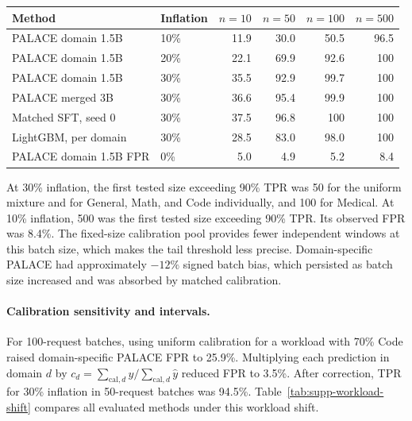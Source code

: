 \documentclass[11pt]{article}
\begin{document}
\begin{center}
\begin{minipage}{\linewidth}
\centering
{}\label{tab:supp-batch-detection}
\small
\begin{tabular}{llrrrr}
\toprule
Method & Inflation & \(n=10\) & \(n=50\) & \(n=100\) & \(n=500\)\\
\midrule
PALACE domain 1.5B &10\%&11.9&30.0&50.5&96.5\\
PALACE domain 1.5B &20\%&22.1&69.9&92.6&100\\
PALACE domain 1.5B &30\%&35.5&92.9&99.7&100\\
PALACE merged 3B &30\%&36.6&95.4&99.9&100\\
Matched SFT, seed 0 &30\%&37.5&96.8&100&100\\
LightGBM, per domain &30\%&28.5&83.0&98.0&100\\
PALACE domain 1.5B FPR &0\%&5.0&4.9&5.2&8.4\\
\bottomrule
\end{tabular}
\end{minipage}
\end{center}
At 30\% inflation, the first tested size exceeding 90\% TPR was 50 for the uniform mixture and for General, Math, and Code individually, and 100 for Medical. At 10\% inflation, 500 was the first tested size exceeding 90\% TPR. Its observed FPR was 8.4\%. The fixed-size calibration pool provides fewer independent windows at this batch size, which makes the tail threshold less precise. Domain-specific PALACE had approximately \(-12\%\) signed batch bias, which persisted as batch size increased and was absorbed by matched calibration.

\paragraph{Calibration sensitivity and intervals.}
For 100-request batches, using uniform calibration for a workload with 70\% Code raised domain-specific PALACE FPR to 25.9\%. Multiplying each prediction in domain \(d\) by \(c_d=\sum_{\mathrm{cal},d} y/\sum_{\mathrm{cal},d}\hat y\) reduced FPR to 3.5\%. After correction, TPR for 30\% inflation in 50-request batches was 94.5\%. Table~\ref{tab:supp-workload-shift} compares all evaluated methods under this workload shift.
\end{document}
